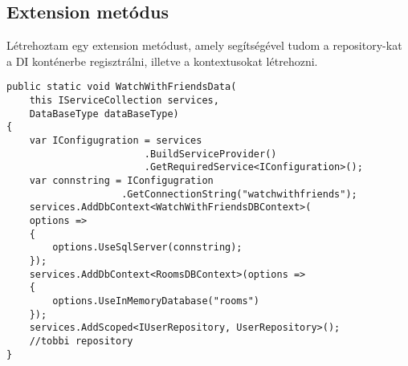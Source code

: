 \subsection*{Extension metódus}
Létrehoztam egy extension metódust, amely segítségével tudom a repository-kat a DI konténerbe regisztrálni, illetve a kontextusokat létrehozni.
\begin{lstlisting}[language=CSharp,style=CSharpBase]
public static void WatchWithFriendsData(
    this IServiceCollection services,
    DataBaseType dataBaseType)
{
    var IConfigugration = services
                        .BuildServiceProvider()
                        .GetRequiredService<IConfiguration>();
    var connstring = IConfigugration
                    .GetConnectionString("watchwithfriends");
    services.AddDbContext<WatchWithFriendsDBContext>(
    options =>
    {
        options.UseSqlServer(connstring);
    });
    services.AddDbContext<RoomsDBContext>(options =>
    {
        options.UseInMemoryDatabase("rooms")
    });
    services.AddScoped<IUserRepository, UserRepository>();
    //tobbi repository
}

\end{lstlisting}